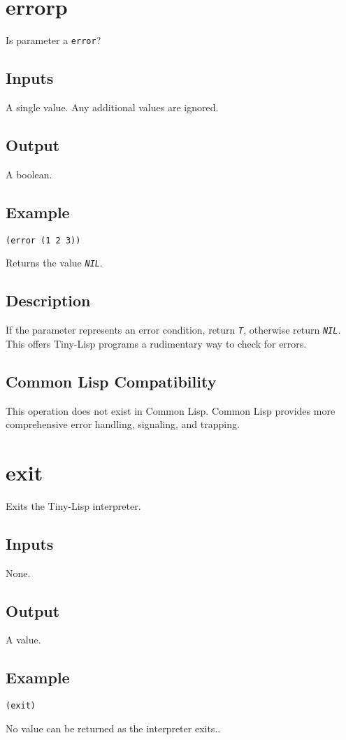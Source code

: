 \documentclass[10pt, openany]{book}
\newcommand{\constant}[1]{\emph{\texttt{#1}}}
\newcommand{\datatype}[1]{\texttt{#1}}
\newcommand{\tl}{Tiny-Lisp}
\newcommand{\cl}{Common Lisp}
\begin{document}
\section{errorp}
Is parameter a \datatype{error}?
\subsection{Inputs}
A single value.  Any additional values are ignored.
\subsection{Output}
A boolean.
\subsection{Example}
\begin{lstlisting}
(error (1 2 3))
\end{lstlisting}
Returns the value \constant{NIL}.
\subsection{Description}
If the parameter represents an error condition, return \constant{T}, otherwise return \constant{NIL}.  This offers \tl{} programs a rudimentary way to check for errors.
\subsection{Common Lisp Compatibility}
This operation does not exist in \cl.  \cl{} provides more comprehensive error handling, signaling, and trapping.

\section{exit}
Exits the \tl{} interpreter.
\subsection{Inputs}
None.
\subsection{Output}
A value.
\subsection{Example}
\begin{lstlisting}
(exit)
\end{lstlisting}
No value can be returned as the interpreter exits..
\end{document}

